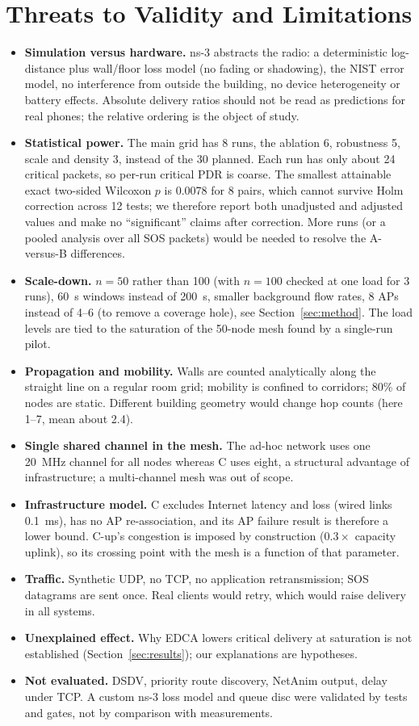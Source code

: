 \section{Threats to Validity and Limitations}\label{sec:threats}
\begin{itemize}
\item \textbf{Simulation versus hardware.} ns-3 abstracts the radio: a deterministic log-distance plus wall/floor loss model (no fading or shadowing), the NIST error model, no interference from outside the building, no device heterogeneity or battery effects. Absolute delivery ratios should not be read as predictions for real phones; the relative ordering is the object of study.
\item \textbf{Statistical power.} The main grid has 8 runs, the ablation 6, robustness 5, scale and density 3, instead of the 30 planned. Each run has only about 24 critical packets, so per-run critical PDR is coarse. The smallest attainable exact two-sided Wilcoxon $p$ is 0.0078 for 8 pairs, which cannot survive Holm correction across 12 tests; we therefore report both unadjusted and adjusted values and make no ``significant'' claims after correction. More runs (or a pooled analysis over all SOS packets) would be needed to resolve the A-versus-B differences.
\item \textbf{Scale-down.} $n=50$ rather than 100 (with $n=100$ checked at one load for 3 runs), 60~s windows instead of 200~s, smaller background flow rates, 8 APs instead of 4--6 (to remove a coverage hole), see Section~\ref{sec:method}. The load levels are tied to the saturation of the 50-node mesh found by a single-run pilot.
\item \textbf{Propagation and mobility.} Walls are counted analytically along the straight line on a regular room grid; mobility is confined to corridors; 80\% of nodes are static. Different building geometry would change hop counts (here 1--7, mean about 2.4).
\item \textbf{Single shared channel in the mesh.} The ad-hoc network uses one 20~MHz channel for all nodes whereas C uses eight, a structural advantage of infrastructure; a multi-channel mesh was out of scope.
\item \textbf{Infrastructure model.} C excludes Internet latency and loss (wired links 0.1~ms), has no AP re-association, and its AP failure result is therefore a lower bound. C-up's congestion is imposed by construction ($0.3\times$ capacity uplink), so its crossing point with the mesh is a function of that parameter.
\item \textbf{Traffic.} Synthetic UDP, no TCP, no application retransmission; SOS datagrams are sent once. Real clients would retry, which would raise delivery in all systems.
\item \textbf{Unexplained effect.} Why EDCA lowers critical delivery at saturation is not established (Section~\ref{sec:results}); our explanations are hypotheses.
\item \textbf{Not evaluated.} DSDV, priority route discovery, NetAnim output, delay under TCP. A custom ns-3 loss model and queue disc were validated by tests and gates, not by comparison with measurements.
\end{itemize}

